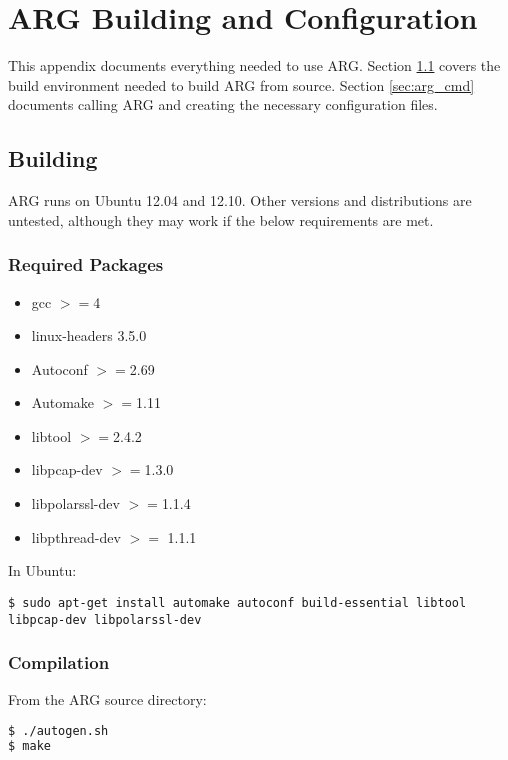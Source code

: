 \chapter{\ac{ARG} Building and Configuration}
\label{chp:argconf}

\par This appendix documents everything needed to use \ac{ARG}. Section \ref{sec:arg_env} covers the build environment needed to build \ac{ARG} from source. Section \ref{sec:arg_cmd} documents calling \ac{ARG} and creating the necessary configuration files.

\section{Building}
\label{sec:arg_env}
\par \ac{ARG} runs on Ubuntu 12.04 and 12.10. Other versions and distributions are untested, although they may work if the below requirements are met. 

\subsection{Required Packages}

{\singlespace
\begin{itemize}
\item gcc $>=$4
\item linux-headers 3.5.0
\item Autoconf $>=$2.69
\item Automake $>=$1.11
\item libtool $>=$2.4.2
\item libpcap-dev $>=$1.3.0
\item libpolarssl-dev $>=$1.1.4
\item libpthread-dev $>=$ 1.1.1 
\end{itemize}
}

\par In Ubuntu:
\begin{lstlisting}
$ sudo apt-get install automake autoconf build-essential libtool libpcap-dev libpolarssl-dev
\end{lstlisting}

\subsection{Compilation}
\par From the \ac{ARG} source directory:
\begin{lstlisting}[language=bash]
$ ./autogen.sh
$ make
\end{lstlisting}

